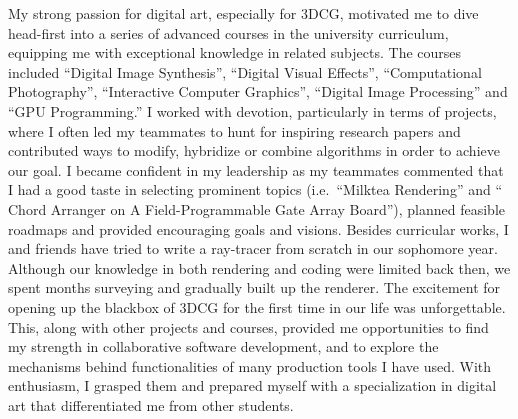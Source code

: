 \documentclass[a4paper, 12pt]{article}
\begin{document}
My strong passion for digital art, especially for 3DCG, motivated me to dive head-first into a series of advanced courses in the university curriculum, equipping me with exceptional knowledge in related subjects. The courses included ``Digital Image Synthesis'', ``Digital Visual Effects'', ``Computational Photography'', ``Interactive Computer Graphics'', ``Digital Image Processing'' and ``GPU Programming.'' I worked with devotion, particularly in terms of projects, where I often led my teammates to hunt for inspiring research papers and contributed ways to modify, hybridize or combine algorithms in order to achieve our goal. I became confident in my leadership as my teammates commented that I had a good taste in selecting prominent topics (i.e.\ ``Milktea Rendering'' and `` Chord Arranger on A Field-Programmable Gate Array Board''), planned feasible roadmaps and provided encouraging goals and visions. Besides curricular works, I and friends have tried to write a ray-tracer from scratch in our sophomore year. Although our knowledge in both rendering and coding were limited back then, we spent months surveying and gradually built up the renderer. The excitement for opening up the blackbox of 3DCG for the first time in our life was unforgettable. This, along with other projects and courses, provided me opportunities to find my strength in collaborative software development, and to explore the mechanisms behind functionalities of many production tools I have used. With enthusiasm, I grasped them and prepared myself with a specialization in digital art that differentiated me from other students.\\

\end{document}
